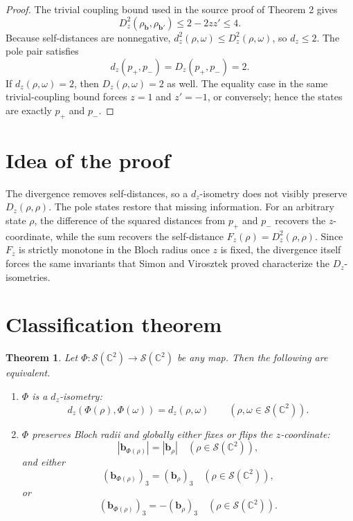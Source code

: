 \documentclass[11pt]{amsart}
\newtheorem{theorem}{Theorem}
\newcommand{\C}{\mathbb C}
\newcommand{\cS}{\mathcal S}
\newcommand{\bb}{\mathbf b}
\newcommand{\om}{\omega}
\begin{document}
\begin{proof}
The trivial coupling bound used in the source proof of Theorem 2 gives
\[
  D_z^2(\rho_{\bb},\rho_{\bb'})
  \leq 2-2zz'\leq 4.
\]
Because self-distances are nonnegative, \(d_z^2(\rho,\om)\leq D_z^2(\rho,\om)\),
so \(d_z\leq2\).  The pole pair satisfies
\[
  d_z(p_+,p_-)=D_z(p_+,p_-)=2.
\]
If \(d_z(\rho,\om)=2\), then \(D_z(\rho,\om)=2\) as well.  The equality case in
the same trivial-coupling bound forces \(z=1\) and \(z'=-1\), or conversely;
hence the states are exactly \(p_+\) and \(p_-\).
\end{proof}

\section{Idea of the proof}

The divergence removes self-distances, so a \(d_z\)-isometry does not visibly
preserve \(D_z(\rho,\rho)\).  The pole states restore that missing information.
For an arbitrary state \(\rho\), the difference of the squared distances from
\(p_+\) and \(p_-\) recovers the \(z\)-coordinate, while the sum recovers the
self-distance \(F_z(\rho)=D_z^2(\rho,\rho)\).  Since \(F_z\) is strictly
monotone in the Bloch radius once \(z\) is fixed, the divergence itself forces
the same invariants that Simon and Virosztek proved characterize the
\(D_z\)-isometries.

\section{Classification theorem}

\begin{theorem}\label{thm:dz-classification}
Let \(\Phi:\cS(\C^2)\to\cS(\C^2)\) be any map.  Then the following are
equivalent.
\begin{enumerate}
\item \(\Phi\) is a \(d_z\)-isometry:
\[
  d_z(\Phi(\rho),\Phi(\om))=d_z(\rho,\om)
  \qquad(\rho,\om\in\cS(\C^2)).
\]
\item \(\Phi\) preserves Bloch radii and globally either fixes or flips the
\(z\)-coordinate:
\[
  |\bb_{\Phi(\rho)}|=|\bb_\rho|\quad(\rho\in\cS(\C^2)),
\]
and either
\[
  (\bb_{\Phi(\rho)})_3=(\bb_\rho)_3\quad(\rho\in\cS(\C^2)),
\]
or
\[
  (\bb_{\Phi(\rho)})_3=-(\bb_\rho)_3\quad(\rho\in\cS(\C^2)).
\]
\end{enumerate}
\end{theorem}
\end{document}
